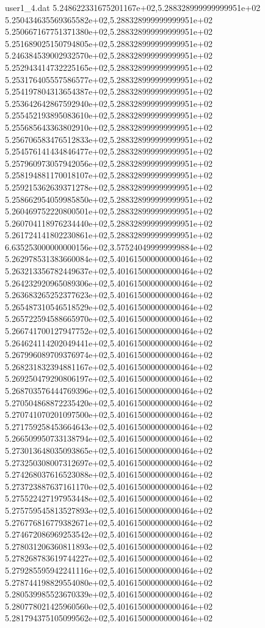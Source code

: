 \begin{filecontents}{user1_4.dat}
5.248622331675201167e+02,5.288328999999999951e+02
5.250434635569365582e+02,5.288328999999999951e+02
5.250667167751371380e+02,5.288328999999999951e+02
5.251689025150794805e+02,5.288328999999999951e+02
5.246384539002932570e+02,5.288328999999999951e+02
5.252943414732225165e+02,5.288328999999999951e+02
5.253176405557586577e+02,5.288328999999999951e+02
5.254197804313654387e+02,5.288328999999999951e+02
5.253642642867592940e+02,5.288328999999999951e+02
5.255452193895083610e+02,5.288328999999999951e+02
5.255685643363802910e+02,5.288328999999999951e+02
5.256706583476512833e+02,5.288328999999999951e+02
5.254576141434846477e+02,5.288328999999999951e+02
5.257960973057942056e+02,5.288328999999999951e+02
5.258194881170018107e+02,5.288328999999999951e+02
5.259215362639371278e+02,5.288328999999999951e+02
5.258662954059985850e+02,5.288328999999999951e+02
5.260469752220800501e+02,5.288328999999999951e+02
5.260704118976234440e+02,5.288328999999999951e+02
5.261724141802230861e+02,5.288328999999999951e+02
6.635253000000000156e+02,3.575240499999999884e+02
5.262978531383660084e+02,5.401615000000000464e+02
5.263213356782449637e+02,5.401615000000000464e+02
5.264232920965089306e+02,5.401615000000000464e+02
5.263683265252377623e+02,5.401615000000000464e+02
5.265487310546518529e+02,5.401615000000000464e+02
5.265722594588665970e+02,5.401615000000000464e+02
5.266741700127947752e+02,5.401615000000000464e+02
5.264624114202049441e+02,5.401615000000000464e+02
5.267996089709376974e+02,5.401615000000000464e+02
5.268231832394881167e+02,5.401615000000000464e+02
5.269250479290806197e+02,5.401615000000000464e+02
5.268703576444769396e+02,5.401615000000000464e+02
5.270504868872235420e+02,5.401615000000000464e+02
5.270741070201097500e+02,5.401615000000000464e+02
5.271759258453664643e+02,5.401615000000000464e+02
5.266509950733138794e+02,5.401615000000000464e+02
5.273013648035093865e+02,5.401615000000000464e+02
5.273250308007312697e+02,5.401615000000000464e+02
5.274268037616523088e+02,5.401615000000000464e+02
5.273723887637161170e+02,5.401615000000000464e+02
5.275522427197953448e+02,5.401615000000000464e+02
5.275759545813527893e+02,5.401615000000000464e+02
5.276776816779382671e+02,5.401615000000000464e+02
5.274672086969253542e+02,5.401615000000000464e+02
5.278031206360811893e+02,5.401615000000000464e+02
5.278268783619744227e+02,5.401615000000000464e+02
5.279285595942241116e+02,5.401615000000000464e+02
5.278744198829554080e+02,5.401615000000000464e+02
5.280539985523670339e+02,5.401615000000000464e+02
5.280778021425960560e+02,5.401615000000000464e+02
5.281794375105099562e+02,5.401615000000000464e+02

\end{filecontents}
